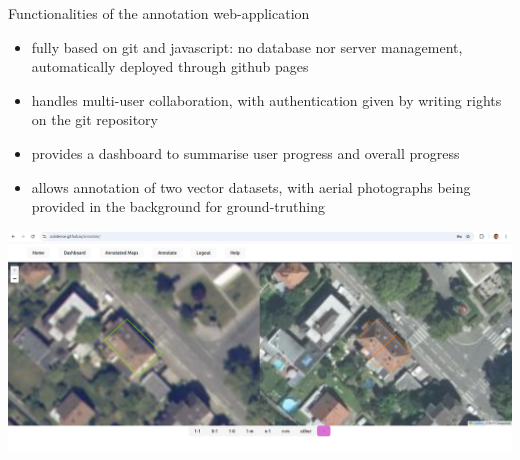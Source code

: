 \documentclass{beamer}
\begin{document}
\begin{frame}{Functionalities of the annotation web-application}


\footnotesize

\begin{itemize}
	\item fully based on git and javascript: no database nor server management, automatically deployed through github pages
	\item handles multi-user collaboration, with authentication given by writing rights on the git repository
	\item provides a dashboard to summarise user progress and overall progress
	\item allows annotation of two vector datasets, with aerial photographs being provided in the background for ground-truthing
\end{itemize}

\smallskip


\begin{center}
  \includegraphics[width=\linewidth]{figures/annotator.png}
\end{center}



\end{frame}
\end{document}
